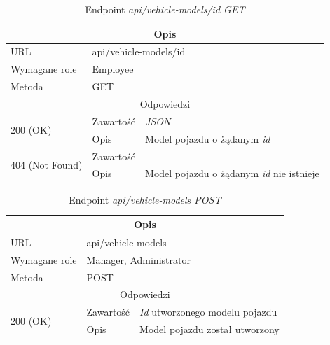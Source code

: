 \documentclass[eng,printmode,openany]{mgr}
\begin{document}
\begin{table}[H]
	\caption{Endpoint \textit{api/vehicle-models/id GET}}
	\begin{tabularx}{\textwidth}{|l|l|X|}
		\hline
		\multicolumn{3}{|c|}{Opis}
		\\ \hline
		URL                         & \multicolumn{2}{l|}{api/vehicle-models/id}
		\\ \hline
		Wymagane role               & \multicolumn{2}{l|}{Employee}
		\\ \hline
		Metoda                      & \multicolumn{2}{l|}{GET}
		\\ \hline
		\multicolumn{3}{|c|}{Odpowiedzi}
		\\ \hline
		\multirow{2}{*}{200 (OK)} 	        & Zawartość   	& \textit{JSON}
		\\ \cline{2-3}                      & Opis         	& Model pojazdu o żądanym \textit{id}
		\\ \hline
		\multirow{2}{*}{404 (Not Found)} 	& Zawartość     & 
		\\ \cline{2-3}                      & Opis          & Model pojazdu o żądanym \textit{id} nie istnieje
		\\ \hline
	\end{tabularx}
\end{table}

\begin{table}[H]
	\caption{Endpoint \textit{api/vehicle-models POST}}
	\begin{tabularx}{\textwidth}{|l|l|X|}
		\hline
		\multicolumn{3}{|c|}{Opis}
		\\ \hline
		URL                       & \multicolumn{2}{l|}{api/vehicle-models}
		\\ \hline
		Wymagane role             & \multicolumn{2}{l|}{Manager, Administrator}
		\\ \hline
		Metoda                    & \multicolumn{2}{l|}{POST}
		\\ \hline
		\multicolumn{3}{|c|}{Odpowiedzi}
		\\ \hline
		\multirow{2}{*}{200 (OK)} 		& Zawartość     & \textit{Id} utworzonego modelu pojazdu
		\\ \cline{2-3}                  & Opis         	& Model pojazdu został utworzony
		\\ \hline
	\end{tabularx}
\end{table}
\end{document}

